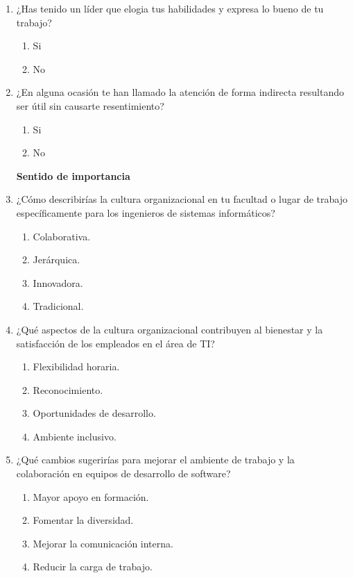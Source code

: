 \documentclass[journal]{IEEEtran}
\begin{document}
\begin{enumerate}
	\item ¿Has tenido un líder que elogia tus habilidades y expresa lo bueno de tu trabajo?
	\begin{enumerate}
		\item Si
		\item No
	\end{enumerate}
	
	\item ¿En alguna ocasión te han llamado la atención de forma indirecta resultando ser útil sin causarte resentimiento?
	\begin{enumerate}
		\item Si
		\item No
	\end{enumerate}
	
	\begin{center}
		\textbf{Sentido de importancia}
	\end{center}
	
	\item ¿Cómo describirías la cultura organizacional en tu facultad o lugar de trabajo específicamente para los ingenieros de sistemas informáticos?
	\begin{enumerate}
		\item Colaborativa.
		\item Jerárquica.
		\item Innovadora.
		\item Tradicional.
	\end{enumerate}
	
	\item ¿Qué aspectos de la cultura organizacional contribuyen al bienestar y la satisfacción de los empleados en el área de TI?
	\begin{enumerate}
		\item Flexibilidad horaria.
		\item Reconocimiento.
		\item Oportunidades de desarrollo.
		\item Ambiente inclusivo.
	\end{enumerate}
	
	\item ¿Qué cambios sugerirías para mejorar el ambiente de trabajo y la colaboración en equipos de desarrollo de software?
	\begin{enumerate}
		\item Mayor apoyo en formación.
		\item Fomentar la diversidad.
		\item Mejorar la comunicación interna.
		\item Reducir la carga de trabajo.
	\end{enumerate}
\end{enumerate}
\end{document}
